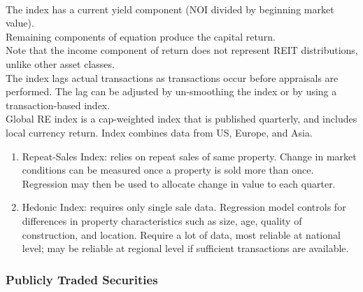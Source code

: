 \begin{remark} \\
The index has a current yield component (NOI divided by beginning market value).\\
Remaining components of equation produce the capital return.\\
Note that the income component of return does not represent REIT distributions, unlike other asset classes.\\
The index lags actual transactions as transactions occur before appraisals are performed. The lag can be adjusted by un-smoothing the index or by using a transaction-based index.\\
Global RE index is a cap-weighted index that is published quarterly, and includes local currency return. Index combines data from US, Europe, and Asia.
\end{remark}

\begin{method} 
\begin{enumerate}[label=\roman*.]
\setlength{\itemsep}{0pt}
\item Repeat-Sales Index: relies on repeat sales of same property. Change in market conditions can be measured once a property is sold more than once.\\
Regression may then be used to allocate change in value to each quarter.
\item Hedonic Index: requires only single sale data. Regression model controls for differences in property characteristics such as size, age, quality of construction, and location. Require a lot of data, most reliable at national level; may be reliable at regional level if sufficient transactions are available.
\end{enumerate}
\end{method}

\subsubsection{Publicly Traded Securities}